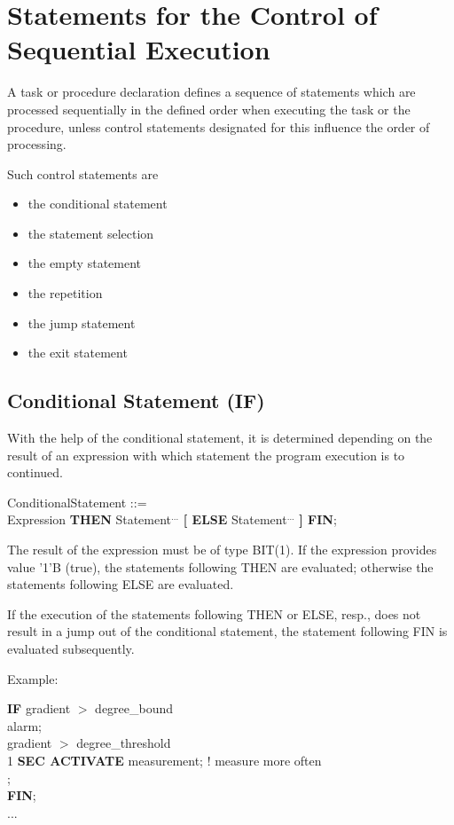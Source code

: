 
\chapter{Statements for the Control of Sequential Execution}   %

A task or procedure declaration defines a sequence of statements which
are processed sequentially in the defined order when executing the task or
the procedure, unless control statements designated for this influence the
order of processing.

Such control statements are
\begin{itemize}
\item the conditional statement
\item the statement selection
\item the empty statement
\item the repetition
\item the jump statement
\item the exit statement
\end{itemize}

\section{Conditional Statement (IF)}   %

With the help of the conditional statement, it is determined depending
on the result of an expression with which statement the program
execution is to continued.

ConditionalStatement ::=\\
 Expression {\bf THEN} Statement$^{...}$ {\bf [ ELSE} Statement$^{...}$ {\bf ] FIN};

The result of the expression must be of type BIT(1). If the expression
provides value '1'B (true), the statements following THEN are evaluated;
otherwise the statements following ELSE are evaluated.

If the execution of the statements following THEN or ELSE, resp., does
not result in a jump out of the conditional statement, the statement
following FIN is evaluated subsequently.

Example:

{\bf IF} gradient $>$ degree\_bound \\
 alarm;\\
 gradient $>$ degree\_threshold \\
\x \x {} 1 {\bf SEC ACTIVATE} measurement; ! measure more often\\
\x {};\\
{\bf FIN};\\
...

